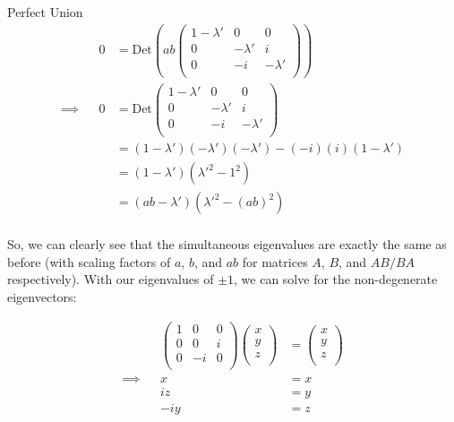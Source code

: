 \begin{answer}
\begin{answerpart}{Perfect Union}
    \begin{equation}
      \begin{alignedat}{2}
        &&0
        &=\text{Det}
        \left(
        ab
        \begin{pmatrix}
          1-\lambda' & 0 & 0\\
          0 & -\lambda' & i\\
          0 & -i & -\lambda'\\
        \end{pmatrix}
        \right)
        \\
        \implies &&0 &= \text{Det}
        \begin{pmatrix}
          1-\lambda' & 0 & 0\\
          0 & -\lambda' & i\\
          0 & -i & -\lambda'\\
        \end{pmatrix}
        \\
        &&&= (1-\lambda')(-\lambda')(-\lambda') - (-i)(i)(1-\lambda')\\
        &&&= (1-\lambda')(\lambda'^2-1^2)\\
        &&&= (ab-\lambda')(\lambda'^2-(ab)^2)\\
      \end{alignedat}
    \end{equation}

    So, we can clearly see that the simultaneous eigenvalues are
    exactly the same as before (with scaling factors of $a$, $b$, and
    $ab$ for matrices $A$, $B$, and $AB/BA$ respectively).  With our
    eigenvalues of $\pm 1$, we can solve for the non-degenerate
    eigenvectors:

    \begin{equation}
      \begin{alignedat}{2}
        &&
        \begin{pmatrix}
          1 & 0 & 0\\
          0 & 0 & i\\
          0 & -i & 0\\
        \end{pmatrix}
        \begin{pmatrix}
          x\\ y\\ z\\
        \end{pmatrix}
        &= \begin{pmatrix}
          x\\ y\\ z\\
        \end{pmatrix}
        \\
        \implies
        &&x &= x\\
        &&iz &= y\\
        &&-iy &= z\\
      \end{alignedat}
    \end{equation}


\end{answerpart}
\end{answer}
